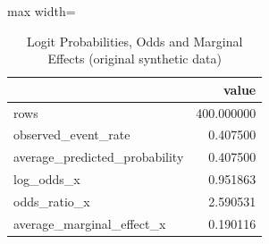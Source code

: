 \begin{table}[htbp]
\centering
\caption{Logit Probabilities, Odds and Marginal Effects (original synthetic data)}
\begingroup
\small
\setlength{\tabcolsep}{6pt}
\renewcommand{\arraystretch}{1.12}
\begin{adjustbox}{max width=\linewidth}
\begin{tabular}{@{}lr@{}}
\toprule
 & value \\
\midrule
rows & 400.000000 \\
observed\_event\_rate & 0.407500 \\
average\_predicted\_probability & 0.407500 \\
log\_odds\_x & 0.951863 \\
odds\_ratio\_x & 2.590531 \\
average\_marginal\_effect\_x & 0.190116 \\
\bottomrule
\end{tabular}
\end{adjustbox}
\endgroup
\end{table}
